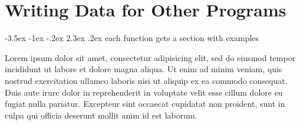 \documentclass[12pt,usenames,dvipsnames,article,oneside]{memoir}
\makeatletter
\renewcommand\section{\@startsection{section}{1}{\z@}%
                                  {-3.5ex \@plus -1ex \@minus -.2ex}%
                                  {2.3ex \@plus.2ex}%
                                  {\normalfont\large\bfseries}} %
\makeatother
\begin{document}
\chapter{Writing Data for Other Programs}

\section{each function gets a section with examples}

Lorem ipsum dolor sit amet, consectetur adipisicing elit, sed do eiusmod tempor incididunt ut labore et dolore magna aliqua. Ut enim ad minim veniam, quis nostrud exercitation ullamco laboris nisi ut aliquip ex ea commodo consequat. Duis aute irure dolor in reprehenderit in voluptate velit esse cillum dolore eu fugiat nulla pariatur. Excepteur sint occaecat cupidatat non proident, sunt in culpa qui officia deserunt mollit anim id est laborum.
\end{document}
